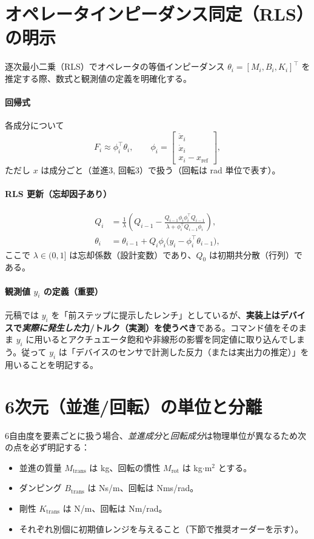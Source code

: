 \documentclass[a4paper,11pt]{article}
\begin{document}
\section{オペレータインピーダンス同定（RLS）の明示}
逐次最小二乗（RLS）でオペレータの等価インピーダンス $\theta_i=[M_i,B_i,K_i]^\top$ を推定する際、数式と観測値の定義を明確化する。

\paragraph{回帰式}
各成分について
\[
  F_i \approx \phi_i^\top \theta_i,\qquad
  \phi_i = \begin{bmatrix} \ddot x_i \\ \dot x_i \\ x_i - x_{\text{ref}} \end{bmatrix},
\]
ただし $x$ は成分ごと（並進3, 回転3）で扱う（回転は rad 単位で表す）。

\paragraph{RLS 更新（忘却因子あり）}
\begin{align}
  Q_i &= \frac{1}{\lambda}\left( Q_{i-1} - \frac{Q_{i-1}\phi_i\phi_i^\top Q_{i-1}}{\lambda + \phi_i^\top Q_{i-1}\phi_i} \right), \\
  \theta_i &= \theta_{i-1} + Q_i \phi_i \big(y_i - \phi_i^\top \theta_{i-1}\big),
\end{align}
ここで $\lambda\in(0,1]$ は忘却係数（設計変数）であり、$Q_0$ は初期共分散（行列）である。\\

\paragraph{観測値 $y_i$ の定義（重要）}
元稿では $y_i$ を「前ステップに提示したレンチ」としているが、\textbf{実装上はデバイスで\emph{実際に発生した}力/トルク（実測）を使うべき}である。コマンド値をそのまま $y_i$ に用いるとアクチュエータ飽和や非線形の影響を同定値に取り込んでしまう。従って $y_i$ は「デバイスのセンサで計測した反力（または実出力の推定）」を用いることを明記する。

\section{6次元（並進/回転）の単位と分離}
6自由度を要素ごとに扱う場合、\emph{並進成分}と\emph{回転成分}は物理単位が異なるため次の点を必ず明記する：
\begin{itemize}
  \item 並進の質量 $M_{\text{trans}}$ は kg、回転の慣性 $M_{\text{rot}}$ は kg$\cdot$m$^2$ とする。
  \item ダンピング $B_{\text{trans}}$ は Ns/m、回転は Nms/rad。
  \item 剛性 $K_{\text{trans}}$ は N/m、回転は Nm/rad。
  \item それぞれ別個に初期値レンジを与えること（下節で推奨オーダーを示す）。
\end{itemize}
\end{document}
